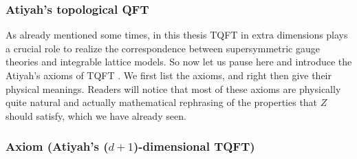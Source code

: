 \subsubsection{Atiyah's topological QFT}
\label{sec:Atiyah_TQFT}

As already mentioned some times, in this thesis TQFT in extra dimensions
plays a crucial role to realize the correspondence between supersymmetric
gauge theories and integrable lattice models. So now let us pause
here and introduce the Atiyah's axioms of TQFT \cite{Atiyah:1989vu}. We first list the
axioms, and right then give their physical meanings. Readers will
notice that most of these axioms are physically quite natural and
actually mathematical rephrasing of the properties that $Z$ should
satisfy, which we have already seen.




\subsubsection*{Axiom (Atiyah's ($d+1$)-dimensional TQFT)}

